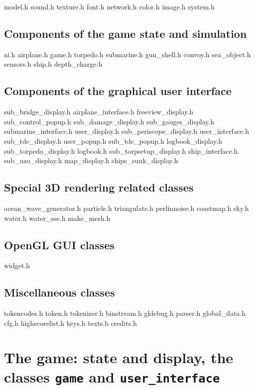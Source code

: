 \documentclass[english,a4paper,12pt]{report}
\begin{document}
model.h sound.h texture.h font.h network.h color.h image.h system.h

\subsection{Components of the game state and simulation}

ai.h airplane.h game.h torpedo.h submarine.h gun_shell.h convoy.h
sea_object.h sensors.h ship.h depth_charge.h

\subsection{Components of the graphical user interface}

sub_bridge_display.h airplane_interface.h freeview_display.h
sub_control_popup.h sub_damage_display.h sub_gauges_display.h
submarine_interface.h user_display.h sub_periscope_display.h
user_interface.h sub_tdc_display.h user_popup.h sub_tdc_popup.h
logbook_display.h sub_torpedo_display.h logbook.h
sub_torpsetup_display.h ship_interface.h sub_uzo_display.h map_display.h
ships_sunk_display.h

\subsection{Special 3D rendering related classes}

ocean_wave_generator.h particle.h triangulate.h perlinnoise.h coastmap.h
sky.h water.h water_sse.h make_mesh.h

\subsection{OpenGL GUI classes}

widget.h

\subsection{Miscellaneous classes}

tokencodes.h token.h tokenizer.h binstream.h gldebug.h parser.h
global_data.h cfg.h highscorelist.h keys.h texts.h credits.h




\section{The game: state and display, the classes \texttt{game} and
  \texttt{user\_interface}}
\end{document}
